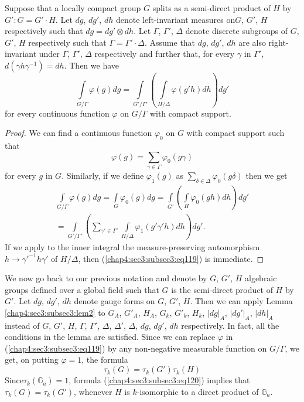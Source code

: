 \setcounter{lemma}{1}
\begin{lemma}\label{chap4:sec3:subsec3:lem2}  %
  Suppose that a locally compact group $G$ splits as a semi-direct
  product of $H$ by $G':G=G'\cdot H$. Let $dg$, $dg'$, $dh$ denote
  left-invariant measures  on\pageoriginale $G$, $G'$, $H$ respectively
  such that $dg=dg'\otimes dh$. Let $\Gamma$, $\Gamma'$, $\Delta$ denote
  discrete subgroups of $G$, $G'$, $H$ respectively such that
  $\Gamma=\Gamma'\cdot \Delta$. Assume that $dg$, $dg'$, $dh$ are also
  right-invariant under $\Gamma$, $\Gamma'$, $\Delta$ respectively and
  further that, for every $\gamma$ in $\Gamma'$, $d(\gamma
  h\gamma^{-1})=dh$. Then we have
  \begin{equation*}
    \int\limits_{G/\Gamma}\varphi(g) dg = \int\limits_{G'/\Gamma'}
    \left(\int\limits_{H/\Delta} \varphi(g'h)dh\right)dg'\tag{119}
    \label{chap4:sec3:subsec3:eq119}
  \end{equation*}
  for every continuous function $\varphi$ on $G/\Gamma$ with compact
  support. 
\end{lemma}

\begin{proof}
  We can find a continuous function $\varphi_{0}$ on $G$ with compact
  support such that
  $$
  \varphi(g)=\sum_{\gamma\in\Gamma}\varphi_{0}(g\gamma)
  $$
  for every $g$ in $G$. Similarly, if we define $\varphi_{1}(g)$ as
  $\sum\limits_{\delta\in\Delta}\varphi_{0}(g\delta)$ then we get 
  \begin{multline*}
  \int\limits_{G/\Gamma}\varphi(g)dg=\int\limits_{G} \varphi_{0} (g)
  dg = \int\limits_{G'}\left(\int\limits_{H}\varphi_{0} (gh) dh\right)
  dg'\\
  =\int\limits_{G'/\Gamma'} \left(\sum_{\gamma'\in\Gamma'}
  \int\limits_{H/\Delta} \varphi_{1}(g'\gamma'h)dh\right)dg'. 
  \end{multline*}
If we apply to the inner integral the measure-preserving automorphism
$h\to {\gamma'}^{-1}h\gamma'$ of $H/\Delta$,
then (\ref{chap4:sec3:subsec3:eq119}) is immediate.
\end{proof}

We now go back to our previous notation and denote by $G$, $G'$, $H$
algebraic groups defined over a global field such that $G$ is the
semi-direct product of $H$ by $G'$. Let $dg$, $dg'$, $dh$ denote gauge
forms on $G$, $G'$, $H$. Then we can apply
Lemma \ref{chap4:sec3:subsec3:lem2} to
$G_{A}$, $G'_{A}$, $H_{A}$, $G_{k}$, $G'_{k}$, $H_{k}$, $|dg|_{A}$,
$|dg'|_{A}$, $|dh|_{A}$ instead of $G$, $G'$, $H$, $\Gamma$,
$\Gamma'$, $\Delta$, $\Delta'$, $\Delta$, $dg$, $dg'$, $dh$
respectively. In fact, all the conditions in the lemma are
satisfied. Since we can replace $\varphi$
in (\ref{chap4:sec3:subsec3:eq119}) by any
non-negative measurable function on $G/\Gamma$, we get, on putting
$\varphi=1$, the formula
\begin{equation*}
  \tau_{k}(G)=\tau_{k}(G')\tau_{k}(H)\tag{120}
  \label{chap4:sec3:subsec3:eq120} 
\end{equation*}
Since\pageoriginale $\tau_{k}(\mathbb{G}_{a})=1$, formula
(\ref{chap4:sec3:subsec3:eq120}) 
implies that $\tau_{k}(G)=\tau_{k}(G')$, whenever $H$ is
$k$-isomorphic to a direct product of $\mathbb{G}_{a}$.

